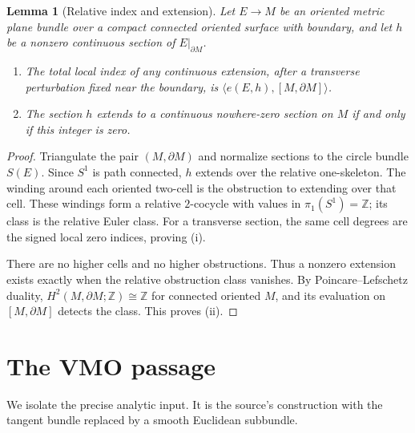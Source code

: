 \documentclass[11pt]{article}
\newtheorem{lemma}[theorem]{Lemma}
\theoremstyle{definition}
\theoremstyle{remark}
\newcommand{\bd}{\partial}
\begin{document}
\begin{lemma}[Relative index and extension]\label{lem:obstruction}
Let $E\to M$ be an oriented metric plane bundle over a compact connected
oriented surface with boundary, and let $h$ be a nonzero continuous section
of $E|_{\bd M}$.
\begin{enumerate}[label=\textup{(\roman*)}]
\item The total local index of any continuous extension, after a transverse
perturbation fixed near the boundary, is
$\langle e(E,h),[M,\bd M]\rangle$.
\item The section $h$ extends to a continuous nowhere-zero section on $M$ if
and only if this integer is zero.
\end{enumerate}
\end{lemma}

\begin{proof}
Triangulate the pair $(M,\bd M)$ and normalize sections to the circle bundle
$S(E)$.  Since $S^1$ is path connected, $h$ extends over the relative
one-skeleton.  The winding around each oriented two-cell is the obstruction
to extending over that cell.  These windings form a relative $2$-cocycle with
values in $\pi_1(S^1)=\mathbb Z$; its class is the relative Euler class.
For a transverse section, the same cell degrees are the signed local zero
indices, proving (i).

There are no higher cells and no higher obstructions.  Thus a nonzero
extension exists exactly when the relative obstruction class vanishes.  By
Poincare--Lefschetz duality,
$H^2(M,\bd M;\mathbb Z)\cong\mathbb Z$ for connected oriented $M$, and its
evaluation on $[M,\bd M]$ detects the class.  This proves (ii).
\end{proof}

\section{The VMO passage}

We isolate the precise analytic input.  It is the source's construction with
the tangent bundle replaced by a smooth Euclidean subbundle.
\end{document}

